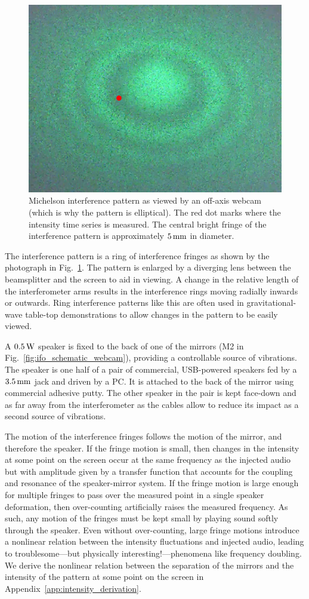 \documentclass[paper-main.tex]{subfiles}
\begin{document}
\begin{figure}
 \begin{center}
  \includegraphics[width=.45\textwidth]{figures/webcam_still0_crop.pdf}
 \end{center}
 \caption{\label{fig:interference_pattern}
Michelson interference pattern as viewed by an off-axis webcam (which is why the pattern is elliptical). 
The red dot marks where the intensity time series is measured. 
The central bright fringe of the interference pattern is approximately $5\,{\rm mm}$ in diameter. 
}
\end{figure}

The interference pattern is a ring of interference fringes as shown by the photograph in Fig.~\ref{fig:interference_pattern}. 
The pattern is enlarged by a diverging lens between the beamsplitter and the screen to aid in viewing. 
A change in the relative length of the interferometer arms results in the interference rings moving radially inwards or outwards. 
Ring interference patterns like this are often used in gravitational-wave table-top demonstrations to allow changes in the pattern to be easily viewed. 


A $0.5\,{\rm W}$ speaker is fixed to the back of one of the mirrors (M2 in Fig.~\ref{fig:ifo_schematic_webcam}), providing a controllable source of vibrations. 
The speaker is one half of a pair of commercial, USB-powered speakers fed by a $3.5\,{\rm mm}$ jack and driven by a PC. 
It is attached to the back of the mirror using commercial adhesive putty. 
The other speaker in the pair is kept face-down and as far away from the interferometer as the cables allow to reduce its impact as a second source of vibrations. 


The motion of the interference fringes follows the motion of the mirror, and therefore the speaker. 
If the fringe motion is small, then changes in the intensity at some point on the screen occur at the same frequency as the injected audio but with amplitude given by a transfer function that accounts for the coupling and resonance of the speaker-mirror system.
If the fringe motion is large enough for multiple fringes to pass over the measured point in a single speaker deformation, then over-counting artificially raises the measured frequency. As such, any motion of the fringes must be kept small by playing sound softly through the speaker.
Even without over-counting, large fringe motions introduce a nonlinear relation between the intensity fluctuations and injected audio, leading to troublesome---but physically interesting!---phenomena like frequency doubling.
We derive the nonlinear relation between the separation of the mirrors and the intensity of the pattern at some point on the screen in Appendix~\ref{app:intensity_derivation}. 
\end{document}
